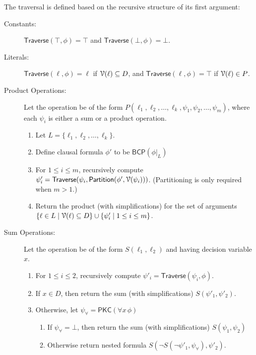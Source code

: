 \documentclass[letterpaper,USenglish,cleveref, autoref, thm-restate]{lipics-v2021}
\newcommand{\tautology}{\top}
\newcommand{\nil}{\bot}
\newcommand{\lit}{\ell}
\newcommand{\dvarset}{D}
\newcommand{\pvarset}{P}
\newcommand{\dependencyset}{{\cal V}}
\newcommand{\simplify}[2]{#1|_{#2}}
\newcommand{\ureduce}[2]{\forall #2\, #1}
\newcommand{\algo}[1]{\textsf{#1}}
\newcommand{\pkc}{\algo{PKC}}
\newcommand{\traverse}{\algo{Traverse}}
\newcommand{\bcp}{\algo{BCP}}
\newcommand{\partition}{\algo{Partition}}
\begin{document}
The traversal is defined based on the recursive structure of its first argument:
\begin{description}
\item[Constants:]
  $\traverse(\tautology, \phi) = \tautology$ and 
  $\traverse(\nil, \phi) = \nil$.

\item[Literals:]
  $\traverse(\lit, \phi) = \lit$ if $\dependencyset(\lit) \subseteq \dvarset$, and $\traverse(\lit, \phi) = \tautology$ if $\dependencyset(\lit) \in \pvarset$.
\item[Product Operations:]
  Let the operation be of the form $P(\lit_1, \lit_2, \ldots, \lit_k, \psi_1, \psi_2, \ldots, \psi_m)$, where each $\psi_i$ is either a sum or a  product operation.
  \begin{enumerate}
  \item Let $L = \{\lit_1, \lit_2, \ldots, \lit_k\}$.
  \item Define clausal formula $\phi'$ to be $\bcp(\simplify{\phi}{L})$
  \item For $1 \leq i \leq m$, recursively compute $\psi'_i = \traverse(\psi_i, \partition(\phi', \dependencyset(\psi_i)))$.  (Partitioning is only required when $m > 1$.)
  \item Return the product (with simplifications) for the set of arguments $\{\lit \in L \mid  \dependencyset(\lit) \subseteq \dvarset\} \cup \{ \psi'_i \mid  1 \leq i \leq m \}$.
  \end{enumerate}
\item[Sum Operations:]
  Let the operation be of the form $S(\lit_1, \lit_2)$ and having decision variable $x$.
  \begin{enumerate}
  \item For $1 \leq i \leq 2$, recursively compute $\psi'_i = \traverse(\psi_i, \phi)$.
  \item If $x \in \dvarset$, then return the sum (with simplifications) $S(\psi'_1, \psi'_2)$.
  \item Otherwise, let $\psi_{\forall} = \pkc(\ureduce{\phi}{x})$
    \begin{enumerate}
    \item If $\psi_{\forall} = \nil$, then return the sum (with simplifications) $S(\psi_1, \psi_2)$
    \item Otherwise return nested formula $S(\neg S(\neg \psi'_1, \psi_{\forall}), \psi'_2)$.
    \end{enumerate}
  \end{enumerate}
\end{description}
\end{document}
